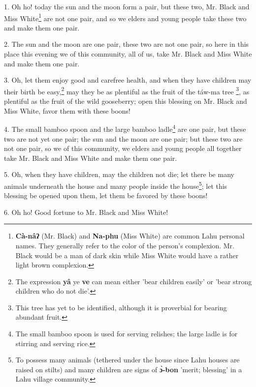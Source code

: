 \setcounter{footnote}{0}

1. Oh ho! today the sun and the moon form a pair, but these two, Mr. Black and Miss
White\footnote{\textbf{Cà-nâʔ} (Mr. Black) and \textbf{Na-phu} (Miss White) are common Lahu personal names. They generally refer to the color of the person's complexion. Mr. Black would be a man of dark skin while Miss White would have a rather light brown complexion.} are not one pair, and so we elders and young people take these two and
make them one pair.

2. The sun and the moon are one pair, these two are not one pair, so here in this
place this evening we of this community, all of us, take Mr. Black and Miss White
and make them one pair.

3. Oh, let them enjoy good and carefree health, and when they have children may
their birth be easy,\footnote{The expression \textbf{yâ} ye \textbf{ve} can mean either 'bear children easily' or 'bear strong children who do not die'.} may they be as plentiful as the fruit of the táw-ma tree
\footnote{This tree has yet to be identified, although it is proverbial for bearing abundant fruit.}, as plentiful as the fruit of the wild gooseberry; open this blessing on Mr.
Black and Miss White, favor them with these boons!

4. The small bamboo spoon and the large bamboo ladle\footnote{The small bamboo spoon is used for serving relishes; the large ladle is for stirring and serving rice.} are one pair, but these
two are not yet one pair; the sun and the moon are one pair; but these two are
not one pair, so we of this community, we elders and young people all together
take Mr. Black and Miss White and make them one pair.

5. Oh, when they have children, may the children not die; let there be many animals
underneath the house and many people inside the house\footnote{To possess many animals (tethered under the house since Lahu houses are raised on stilts) and many children are signs of \textbf{ɔ̀-bon} 'merit; blessing' in a Lahu village community.}; let this blessing be
opened upon them, let them be favored by these boons!

6. Oh ho! Good fortune to Mr. Black and Miss White!

